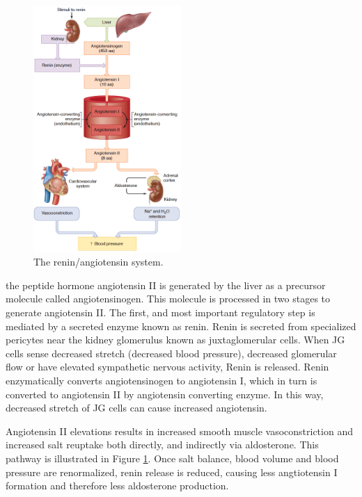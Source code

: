 \documentclass{tufte-handout}
\begin{document}
\begin{figure}
\centering
  \includegraphics[width=0.5\textwidth]{figures/renin-angiotensin}
  \caption{The renin/angiotensin system.}
    \label{fig:renin-angiotensin}
\end{figure}

 the peptide hormone angiotensin II is generated by the liver as a precursor molecule called angiotensinogen.  This molecule is processed in two stages to generate angiotensin II.  The first, and most important regulatory step is mediated by a secreted enzyme known as renin.  Renin is secreted from specialized pericytes near the kidney glomerulus known as juxtaglomerular cells.  When JG cells sense decreased stretch (decreased blood pressure), decreased glomerular flow or have elevated sympathetic nervous activity, Renin is released.  Renin enzymatically converts angiotensinogen to angiotensin I, which in turn is converted to angiotensin II by angiotensin converting enzyme.  In this way, decreased stretch of JG cells can cause increased angiotensin.  

Angiotensin II elevations results in increased smooth muscle vasoconstriction and increased salt reuptake both directly, and indirectly via aldosterone.  This pathway is illustrated in Figure \ref{fig:renin-angiotensin}.  Once salt balance, blood volume and blood pressure are renormalized, renin release is reduced, causing less angtiotensin I formation and therefore less aldosterone production.
\end{document}
